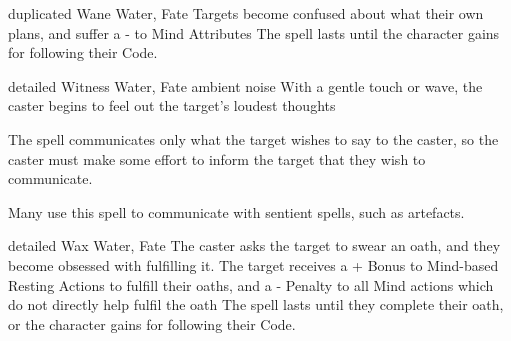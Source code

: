 \ifodd\value{diceNo}

  {duplicated}%
  {Wane}%
  {Water, Fate}%
  {}%
  {Targets become confused about what their own plans, and suffer a - to Mind Attributes}%
  {The spell lasts until the character gains  for following their Code.}

  {detailed}%
  {Witness}%
  {Water, Fate}%
  {ambient noise}%
  {With a gentle touch or wave, the caster begins to feel out the target's loudest thoughts}%
  {The spell communicates only what the target wishes to say to the caster, so the caster must make some effort to inform the target that they wish to communicate.

  Many use this spell to communicate with sentient spells, such as \glspl{artefact}.}

\else

  {detailed}%
  {Wax}%
  {Water, Fate}%
  {}%
  {The caster asks the target to swear an oath, and they become obsessed with fulfilling it.
  The target receives a + Bonus to Mind-based Resting Actions to fulfill their oaths, and a - Penalty to all Mind actions which do not directly help fulfil the oath}%
  {The spell lasts until they complete their oath, or the character gains  for following their Code.}

\fi
{}
